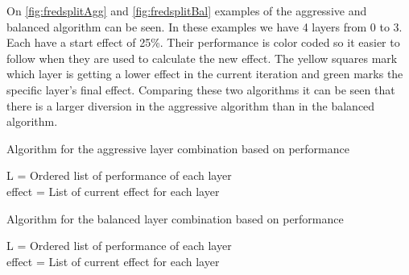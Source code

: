 On \autoref{fig:fredsplitAgg} and \autoref{fig:fredsplitBal} examples of the aggressive and balanced algorithm can be seen.
In these examples we have 4 layers from 0 to 3.
Each have a start effect of 25\%.
Their performance is color coded so it easier to follow when they are used to calculate the new effect.
The yellow squares mark which layer is getting a lower effect in the current iteration and green marks the specific layer's final effect.
Comparing these two algorithms it can be seen that there is a larger diversion in the aggressive algorithm than in the balanced algorithm.
\begin{algorithm}
    \caption{Algorithm for the aggressive layer combination based on performance}
    \SetAlgoLined
    L = Ordered list of performance of each layer \\
    effect  = List of current effect for each layer \\
    \label{alg:aggresive-layereffect}
\end{algorithm}

\begin{algorithm}
    \caption{Algorithm for the balanced layer combination based on performance}
    \SetAlgoLined
    L = Ordered list of performance of each layer \\
    effect  = List of current effect for each layer \\
    \label{alg:bal-layereffect}
\end{algorithm}


